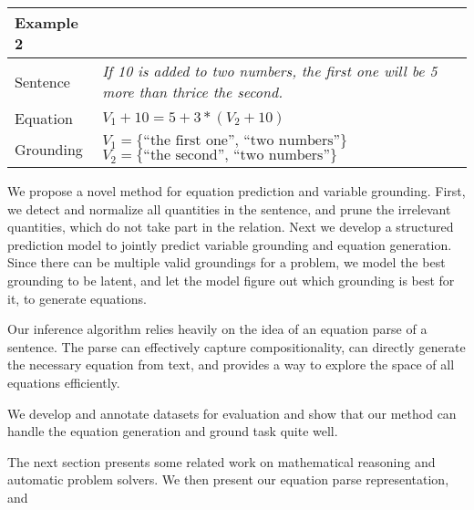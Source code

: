   \setlength{\tabcolsep}{6pt} 
  \begin{table}[H] 
         \centering 
         \small 
         \begin{tabular}{|lp{5cm}|} \hline
         Example 2 & \\ \hline 
         Sentence & {\em If 10 is added to two numbers,
         the first one will be 5 more than thrice the second.} \\ \hline
         Equation & $V_1+10=5+3*(V_2+10)$\\ \hline 
         Grounding & $V_1= \{\text{``the first one'', ``two numbers''}\}$
         $V_2= \{\text{``the second'', ``two numbers''}\}$\\ 
        \hline 
        \end{tabular} 
        \label{tab:example2} 
  \end{table}
  
  We propose a novel method for equation prediction and variable
  grounding. First, we detect and normalize all quantities in the
  sentence, and prune the irrelevant quantities, which do not take
  part in the relation. Next we develop a structured prediction model
  to jointly predict variable grounding and equation generation. Since
  there can be multiple valid groundings for a problem, we model the
  best grounding to be latent, and let the model figure out which
  grounding is best for it, to generate equations.
  
  Our inference algorithm relies heavily on the idea of an equation
  parse of a sentence. The parse can effectively capture
  compositionality, can directly generate the necessary equation from
  text, and provides a way to explore the space of all equations
  efficiently.

  We develop and annotate datasets for evaluation and show that our
  method can handle the equation generation and ground task quite
  well.

  The next section presents some related work on mathematical
  reasoning and automatic problem solvers. We then present our
  equation parse representation, and
  

